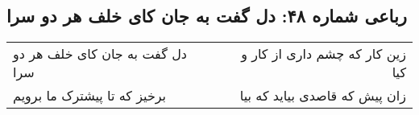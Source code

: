 \begin{center}
\section*{رباعی شماره ۴۸: دل گفت به جان کای خلف هر دو سرا}
\label{sec:0048}
\begin{longtable}{l p{0.5cm} r}
دل گفت به جان کای خلف هر دو سرا
&&
زین کار که چشم داری از کار و کیا
\\
برخیز که تا پیشترک ما برویم
&&
زان پیش که قاصدی بیاید که بیا
\\
\end{longtable}
\end{center}
